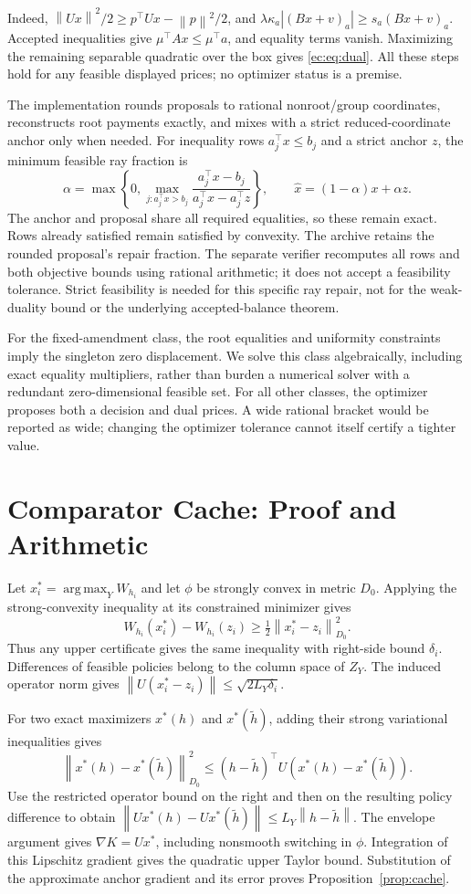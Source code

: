 \documentclass[11pt,letterpaper]{article}
\theoremstyle{definition}\newtheorem{remark}[theorem]{Remark}
\newcommand{\norm}[1]{\left\lVert#1\right\rVert}\newcommand{\argmax}{\operatorname*{arg\,max}}
\begin{document}
Indeed, $\norm{Ux}^2/2\geq p^\top Ux-\norm p^2/2$, and $\lambda\kappa_a|(Bx+v)_a|\geq s_a(Bx+v)_a$. Accepted inequalities give $\mu^\top Ax\leq\mu^\top a$, and equality terms vanish. Maximizing the remaining separable quadratic over the box gives \eqref{ec:eq:dual}. All these steps hold for any feasible displayed prices; no optimizer status is a premise.

The implementation rounds proposals to rational nonroot/group coordinates, reconstructs root payments exactly, and mixes with a strict reduced-coordinate anchor only when needed. For inequality rows $a_j^\top x\leq b_j$ and a strict anchor $z$, the minimum feasible ray fraction is
\[
 \alpha=\max\left\{0,\max_{j:a_j^\top x>b_j}
 \frac{a_j^\top x-b_j}{a_j^\top x-a_j^\top z}\right\},\qquad
 \widehat x=(1-\alpha)x+\alpha z.
\]
The anchor and proposal share all required equalities, so these remain exact. Rows already satisfied remain satisfied by convexity. The archive retains the rounded proposal's repair fraction. The separate verifier recomputes all rows and both objective bounds using rational arithmetic; it does not accept a feasibility tolerance. Strict feasibility is needed for this specific ray repair, not for the weak-duality bound or the underlying accepted-balance theorem.

For the fixed-amendment class, the root equalities and uniformity constraints imply the singleton zero displacement. We solve this class algebraically, including exact equality multipliers, rather than burden a numerical solver with a redundant zero-dimensional feasible set. For all other classes, the optimizer proposes both a decision and dual prices. A wide rational bracket would be reported as wide; changing the optimizer tolerance cannot itself certify a tighter value.

\section{Comparator Cache: Proof and Arithmetic}\label{ec:cache}
Let $x_i^*=\argmax_Y W_{h_i}$ and let $\phi$ be strongly convex in metric $D_0$. Applying the strong-convexity inequality at its constrained minimizer gives
\[
 W_{h_i}(x_i^*)-W_{h_i}(z_i)\geq\tfrac12\norm{x_i^*-z_i}_{D_0}^2.
\]
Thus any upper certificate gives the same inequality with right-side bound $\delta_i$. Differences of feasible policies belong to the column space of $Z_Y$. The induced operator norm gives
$\norm{U(x_i^*-z_i)}\leq\sqrt{2L_Y\delta_i}$.

For two exact maximizers $x^*(h)$ and $x^*(\tilde h)$, adding their strong variational inequalities gives
\[
 \norm{x^*(h)-x^*(\tilde h)}_{D_0}^2
 \leq (h-\tilde h)^\top U(x^*(h)-x^*(\tilde h)).
\]
Use the restricted operator bound on the right and then on the resulting policy difference to obtain
$\norm{Ux^*(h)-Ux^*(\tilde h)}\leq L_Y\norm{h-\tilde h}$.
The envelope argument gives $\nabla K=Ux^*$, including nonsmooth switching in $\phi$. Integration of this Lipschitz gradient gives the quadratic upper Taylor bound. Substitution of the approximate anchor gradient and its error proves Proposition~\ref{prop:cache}.
\end{document}
